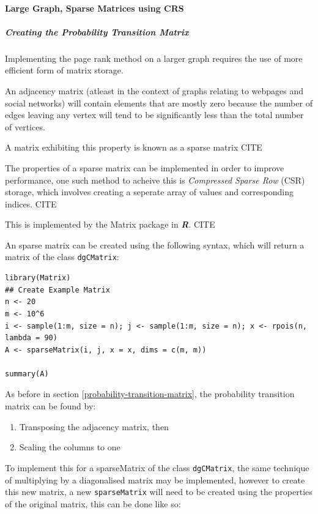 \documentclass[11pt]{article}
\begin{document}
\paragraph{Large Graph, Sparse Matrices using CRS}
\label{sec:orgb505ce2}
\subparagraph{Creating the Probability Transition Matrix}
\label{sec:org5b1fee0}
Implementing the page rank method on a larger graph requires the use of more efficient form of matrix storage.

An adjacency matrix (atleast in the context of graphs relating to webpages and social networks) will contain elements that are mostly zero because the number of edges leaving any vertex will tend to be significantly less than the total number of vertices.

A matrix exhibiting this property is known as a sparse matrix CITE

The properties of a sparse matrix can be implemented in order to improve performance, one such method to acheive this is \emph{Compressed Sparse Row} (CSR) storage, which involves creating a seperate array of values and corresponding indices. CITE

This is implemented by the Matrix package in \textbf{\emph{R}}. CITE

An sparse matrix can be created using the following syntax, which will return a matrix of the class \texttt{dgCMatrix}:

\begin{verbatim}
library(Matrix)
## Create Example Matrix
n <- 20
m <- 10^6
i <- sample(1:m, size = n); j <- sample(1:m, size = n); x <- rpois(n, lambda = 90)
A <- sparseMatrix(i, j, x = x, dims = c(m, m))

summary(A)
\end{verbatim}

As before in section \ref{probability-transition-matrix}, the probability transition matrix can be found by:

\begin{enumerate}
\item Transposing the adjacency matrix, then
\item Scaling the columns to one
\end{enumerate}

To implement this for a sparseMatrix of the class \texttt{dgCMatrix}, the same technique of multiplying by a diagonalised matrix may be implemented, however to create this new matrix, a new \texttt{sparseMatrix} will need to be created using the properties of the original matrix, this can be done like so:
\end{document}

